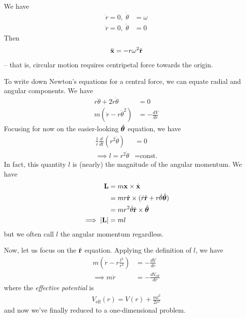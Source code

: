 \documentclass{../template/note}
\begin{document}
    \begin{example}
        We have
        \begin{align*}
            \dot r = 0, \; \dot \theta &= \omega \\
            \ddot r = 0, \; \ddot \theta &= 0
        \end{align*}
        Then
        \begin{align*}
            \ddot{\V x} = -r\omega^2 \hvec r
        \end{align*}
        -- that is, circular motion requires centripetal force towards the origin.
    \end{example}
    
    To write down Newton's equations for a central force, we can equate radial and angular components. We have
    \begin{align*}
        r \ddot \theta + 2 \dot r \dot \theta &= 0 \\
        m\left(\ddot r - r \dot{\theta}^2\right) &= -\frac{dV}{dr}
    \end{align*}
    Focusing for now on the easier-looking \(\hvec \theta\) equation, we have
    \begin{align*}
        \frac 1 r \frac{d}{dt}(r^2 \dot \theta) &= 0 \\
        \implies l = r^2 \dot \theta &= \text{const.}
    \end{align*}
    In fact, this quantity \(l\) is (nearly) the magnitude of the angular momentum. We have
    \begin{align*}
        \V L &= m \V x \times \dot{\V x} \\
        &= mr \hvec r \times (\dot r \hvec r + r \dot \theta \hvec \theta) \\
        &= mr^2 \dot \theta \hvec r \times \hvec \theta \\
        \implies |\V L| &= ml
    \end{align*}
    but we often call \(l\) the angular momentum regardless.

    Now, let us focus on the \(\hvec r\) equation. Applying the definition of \(l\), we have
    \begin{align*}
        m\left(\ddot r - r\frac{l^2}{r^4}\right) &= -\frac{dV}{dr} \\
        \implies m \ddot r &= -\frac{dV_\text{eff}}{dr}
    \end{align*}
    where the \emph{effective potential} is
    \begin{align*}
        V_\text{eff}(r) = V(r) + \frac{ml^2}{2r^2}
    \end{align*}
    and now we've finally reduced to a one-dimensional problem.
\end{document}
